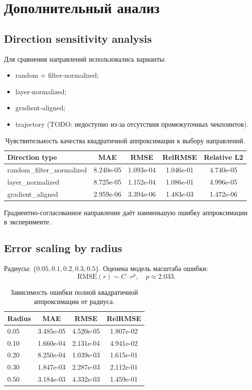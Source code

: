 \section{Дополнительный анализ}

\subsection{Direction sensitivity analysis}

Для сравнения направлений использовались варианты:
\begin{itemize}
    \item random + filter-normalized;
    \item layer-normalized;
    \item gradient-aligned;
    \item trajectory (TODO: недоступно из-за отсутствия промежуточных чекпоинтов).
\end{itemize}

\begin{table}[H]
\centering
\begin{tabular}{lcccc}
\toprule
Direction type & MAE & RMSE & RelRMSE & Relative L2 \\
\midrule
random\_filter\_normalized & 8.240e-05 & 1.093e-04 & 1.046e-01 & 4.740e-05 \\
layer\_normalized & 8.725e-05 & 1.152e-04 & 1.086e-01 & 4.996e-05 \\
gradient\_aligned & 2.959e-06 & 3.394e-06 & 1.483e-03 & 1.472e-06 \\
\bottomrule
\end{tabular}
\caption{Чувствительность качества квадратичной аппроксимации к выбору направлений.}
\label{tab:direction_sensitivity}
\end{table}

Градиентно-согласованное направление даёт наименьшую ошибку аппроксимации в эксперименте.

\subsection{Error scaling by radius}

Радиусы: $\{0.05, 0.1, 0.2, 0.3, 0.5\}$.
Оценена модель масштаба ошибки:
\[
\text{RMSE}(r) \sim C \cdot r^p,\quad p \approx 2.033.
\]

\begin{table}[H]
\centering
\begin{tabular}{lccc}
\toprule
Radius & MAE & RMSE & RelRMSE \\
\midrule
0.05 & 3.485e-05 & 4.520e-05 & 1.807e-02 \\
0.10 & 1.660e-04 & 2.131e-04 & 4.941e-02 \\
0.20 & 8.250e-04 & 1.039e-03 & 1.615e-01 \\
0.30 & 1.847e-03 & 2.287e-03 & 2.112e-01 \\
0.50 & 3.184e-03 & 4.332e-03 & 1.459e-01 \\
\bottomrule
\end{tabular}
\caption{Зависимость ошибки полной квадратичной аппроксимации от радиуса.}
\label{tab:error_by_radius}
\end{table}

